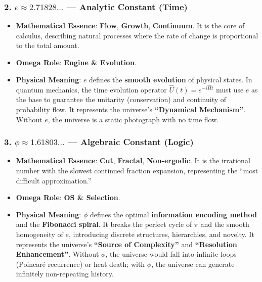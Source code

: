 \subsubsection{2. \texorpdfstring{$e \approx 2.71828...$}{e approx 2.71828...} --- Analytic Constant (Time)}

\begin{itemize}
\item \textbf{Mathematical Essence}: \textbf{Flow}, \textbf{Growth}, \textbf{Continuum}. It is the core of calculus, describing natural processes where the rate of change is proportional to the total amount.
\item \textbf{Omega Role}: \textbf{Engine \& Evolution}.
\item \textbf{Physical Meaning}: $e$ defines the \textbf{smooth evolution} of physical states. In quantum mechanics, the time evolution operator $\hat{U}(t) = e^{-i\hat{H}t}$ must use $e$ as the base to guarantee the unitarity (conservation) and continuity of probability flow. It represents the universe's \textbf{``Dynamical Mechanism''}. Without $e$, the universe is a static photograph with no time flow.
\end{itemize}

\subsubsection{3. \texorpdfstring{$\phi \approx 1.61803...$}{phi approx 1.61803...} --- Algebraic Constant (Logic)}

\begin{itemize}
\item \textbf{Mathematical Essence}: \textbf{Cut}, \textbf{Fractal}, \textbf{Non-ergodic}. It is the irrational number with the slowest continued fraction expansion, representing the ``most difficult approximation.''
\item \textbf{Omega Role}: \textbf{OS \& Selection}.
\item \textbf{Physical Meaning}: $\phi$ defines the optimal \textbf{information encoding method} and the \textbf{Fibonacci spiral}. It breaks the perfect cycle of $\pi$ and the smooth homogeneity of $e$, introducing discrete structures, hierarchies, and novelty. It represents the universe's \textbf{``Source of Complexity''} and \textbf{``Resolution Enhancement''}. Without $\phi$, the universe would fall into infinite loops (Poincar\'{e} recurrence) or heat death; with $\phi$, the universe can generate infinitely non-repeating history.
\end{itemize}

